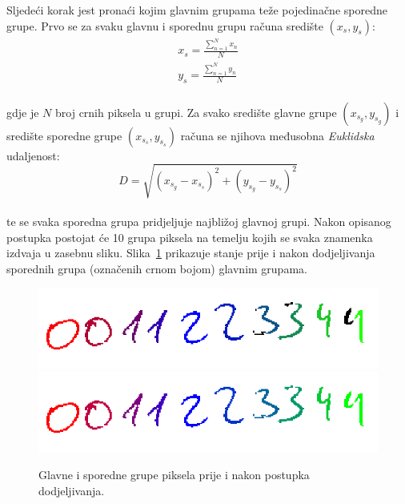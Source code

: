 Sljedeći korak jest pronaći kojim glavnim grupama teže pojedinačne sporedne grupe. Prvo se za svaku glavnu i sporednu
grupu računa središte $(x_s, y_s)$:\\
\begin{align*}
    x_s = \frac{\sum_{n = 1}^{N} x_n}{N}\\
    y_s = \frac{\sum_{n = 1}^{N} y_n}{N}
\end{align*}\\
gdje je $N$ broj crnih piksela u grupi. Za svako središte glavne grupe $(x_{s_g}, y_{s_g})$ i središte sporedne grupe
$(x_{s_s}, y_{s_s})$ računa se njihova međusobna \emph{Euklidska} udaljenost:\\
\begin{equation*}
    D = \sqrt{(x_{s_g} - x_{s_s})^{2} + (y_{s_g} - y_{s_s})^{2}}
\end{equation*}\\
te se svaka sporedna grupa pridjeljuje najbližoj glavnoj grupi. Nakon opisanog postupka postojat će 10 grupa piksela
na temelju kojih se svaka znamenka izdvaja u zasebnu sliku. Slika\ \ref{fig:assigned-minor-groups} prikazuje stanje
prije i nakon dodjeljivanja sporednih grupa (označenih crnom bojom) glavnim grupama.
\begin{figure}[htb]
    \centering
    \includegraphics[width=12cm]{images/unassigned-minor-groups.png}
    \includegraphics[width=12cm]{images/assigned-minor-groups.png}
    \caption{Glavne i sporedne grupe piksela prije i nakon postupka dodjeljivanja.}
    \label{fig:assigned-minor-groups}
\end{figure}


